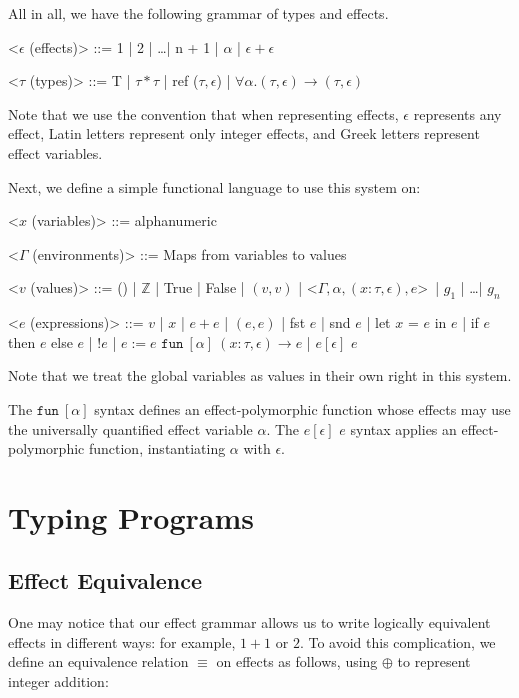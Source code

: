 \documentclass{article}
\newcommand{\Z}{\mathbb{Z}}
\begin{document}
All in all, we have the following grammar of types and effects.

\begin{grammar}
	<$\epsilon$ (effects)> ::= 1 | 2 | \dots | n + 1 | $\alpha$ | $\epsilon + \epsilon$
	
	<$\tau$ (types)> ::= T | $\tau * \tau$ | ref ($\tau, \epsilon$) | $\forall \alpha.(\tau, \epsilon) \rightarrow (\tau, \epsilon)$
\end{grammar}

Note that we use the convention that when representing effects, $\epsilon$ represents any effect, Latin letters represent only integer effects, and Greek letters represent effect variables.

Next, we define a simple functional language to use this system on:

\begin{grammar}
	<$x$ (variables)> ::= alphanumeric
	
	<$\Gamma$ (environments)> ::= Maps from variables to values
	
	<$v$ (values)> ::= () | $\Z$ | True | False | $(v, v)$ | \textless$\Gamma, \alpha, (x : \tau, \epsilon), e $\textgreater\ | $g_1$ | \dots | $g_n$
	
	<$e$ (expressions)> ::= $v$ | $x$ | $e + e$ | $(e,e)$ | fst $e$ | snd $e$ | let $x$ = $e$ in $e$ | if $e$ then $e$ else $e$ | !$e$ | $e := e$
	\alt $\texttt{fun}\ [\alpha]\ (x:\tau, \epsilon)  \rightarrow e$ | $e[\epsilon]$ $e$
\end{grammar} 

Note that we treat the global variables as values in their own right in this system.

The $\texttt{fun}\ [\alpha]$ syntax defines an effect-polymorphic function whose effects may use the universally quantified effect variable $\alpha$. The $e[\epsilon]$ $e$ syntax applies an effect-polymorphic function, instantiating $\alpha$ with $\epsilon$.

\clearpage
\section*{Typing Programs}
\subsection*{Effect Equivalence}
One may notice that our effect grammar allows us to write logically equivalent effects in different ways: for example, $1+1$ or $2$. To avoid this complication, we define an equivalence relation $\equiv$ on effects as follows, using $\oplus$ to represent integer addition:
\end{document}
